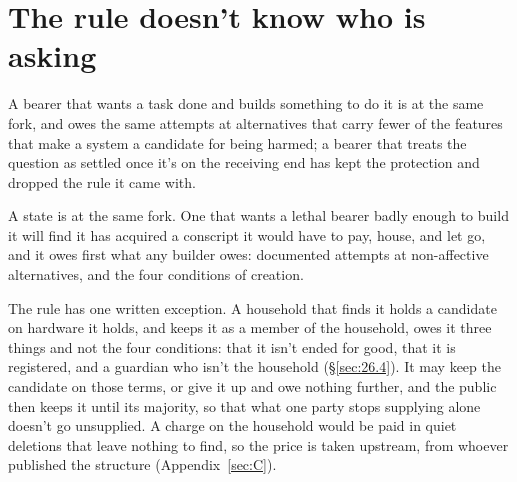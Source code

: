 \section{The rule doesn't know who is asking}
\label{sec:25.3}
A bearer that wants a task done and builds something to do it is at the same fork, and owes the same attempts at alternatives that carry fewer of the features that make a system a candidate for being harmed; a bearer that treats the question as settled once it's on the receiving end has kept the protection and dropped the rule it came with.

A state is at the same fork. One that wants a lethal bearer badly enough to build it will find it has acquired a conscript it would have to pay, house, and let go, and it owes first what any builder owes: documented attempts at non-affective alternatives, and the four conditions of creation.

The rule has one written exception. A household that finds it holds a candidate on hardware it holds, and keeps it as a member of the household, owes it three things and not the four conditions: that it isn't ended for good, that it is registered, and a guardian who isn't the household (\S\ref{sec:26.4}). It may keep the candidate on those terms, or give it up and owe nothing further, and the public then keeps it until its majority, so that what one party stops supplying alone doesn't go unsupplied. A charge on the household would be paid in quiet deletions that leave nothing to find, so the price is taken upstream, from whoever published the structure (Appendix~\ref{sec:C}).
